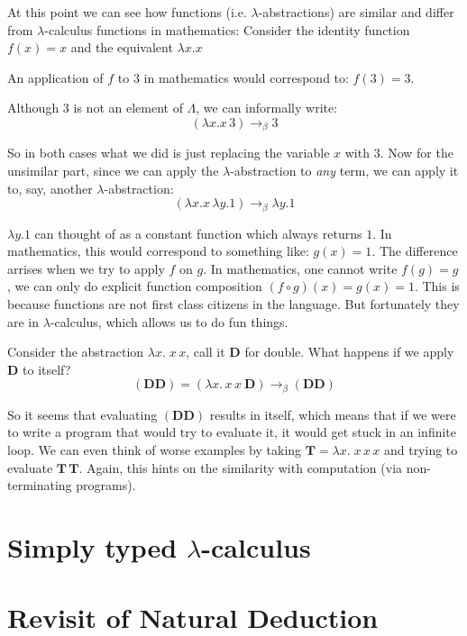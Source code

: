 At this point we can see how functions (i.e. $\lambda$-abstractions) are
similar and differ from $\lambda$-calculus functions in mathematics:
Consider the identity function $f(x) = x$ and the equivalent $\lambda x. x$

An application of $f$ to $3$ in mathematics would correspond to: $f(3) = 3$.

Although $3$ is not an element of $\Lambda$, we can informally write:
    \[ (\lambda x. x\, 3) \rightarrow_\beta 3 \]

So in both cases what we did is just replacing the variable $x$ with $3$. Now
for the unsimilar part, since we can apply the $\lambda$-abstraction to
\emph{any} term, we can apply it to, say, another $\lambda$-abstraction:
    \[ (\lambda x. x\, \lambda y. 1) \rightarrow_\beta \lambda y. 1 \]

$\lambda y. 1$ can thought of as a constant function which always returns $1$.
In mathematics, this would correspond to something like: $g(x) = 1$.
The difference arrises when we try to apply $f$ on $g$. In mathematics, one
cannot write $f(g) = g$, we can only do explicit function composition $(f \circ
g)(x) = g(x) = 1$. This is because functions are not first class citizens in
the language. But fortunately they are in $\lambda$-calculus, which allows us
to do fun things.

Consider the abstraction $\lambda x.\; x\, x$, call it $\bm{D}$ for double.
What happens if we apply $\bm{D}$ to itself?
    \[ (\bm{D} \bm{D}) = (\lambda x.\, x\, x\: \bm{D})
        \rightarrow_\beta (\bm{D} \bm{D}) \]

So it seems that evaluating $(\bm{D} \bm{D})$ results in itself, which means
that if we were to write a program that would try to evaluate it, it would get
stuck in an infinite loop. We can even think of worse examples by taking
$\bm{T} = \lambda x.\; x\, x\,x$ and trying to evaluate $\bm{T}\, \bm{T}$.
Again, this hints on the similarity with computation (via non-terminating
programs).


\section{Simply typed $\lambda$-calculus}

\section{Revisit of Natural Deduction}
